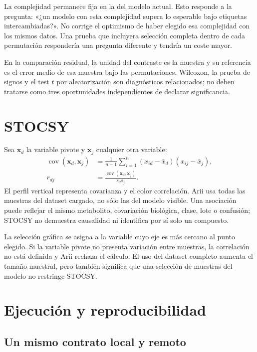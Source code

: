 \documentclass[11pt,a4paper,openany]{report}
\newcommand{\vect}[1]{\boldsymbol{#1}}
\begin{document}
La complejidad permanece fija en la del modelo actual. Esto responde a la pregunta: «¿un modelo con esta complejidad supera lo esperable bajo etiquetas intercambiadas?». No corrige el optimismo de haber elegido esa complejidad con los mismos datos. Una prueba que incluyera selección completa dentro de cada permutación respondería una pregunta diferente y tendría un coste mayor.

En la comparación residual, la unidad del contraste es la muestra y su referencia es el error medio de esa muestra bajo las permutaciones. Wilcoxon, la prueba de signos y el test $t$ por aleatorización son diagnósticos relacionados; no deben tratarse como tres oportunidades independientes de declarar significancia.

\chapter{STOCSY}
Sea $\vect{x}_{d}$ la variable pivote y $\vect{x}_{j}$ cualquier otra variable:
\begin{align}
  \operatorname{cov}(\vect{x}_{d},\vect{x}_{j}) &=
  \frac{1}{n-1}\sum_{i=1}^{n}(x_{id}-\bar{x}_{d})(x_{ij}-\bar{x}_{j}), \\
  r_{dj} &= \frac{\operatorname{cov}(\vect{x}_{d},\vect{x}_{j})}{s_d s_j}.
\end{align}
El perfil vertical representa covarianza y el color correlación. Arii usa todas las muestras del dataset cargado, no sólo las del modelo visible. Una asociación puede reflejar el mismo metabolito, covariación biológica, clase, lote o confusión; STOCSY no demuestra causalidad ni identifica por sí solo un compuesto.

La selección gráfica se asigna a la variable cuyo eje es más cercano al punto elegido. Si la variable pivote no presenta variación entre muestras, la correlación no está definida y Arii rechaza el cálculo. El uso del dataset completo aumenta el tamaño muestral, pero también significa que una selección de muestras del modelo no restringe STOCSY.

\chapter{Ejecución y reproducibilidad}

\section{Un mismo contrato local y remoto}
\end{document}
